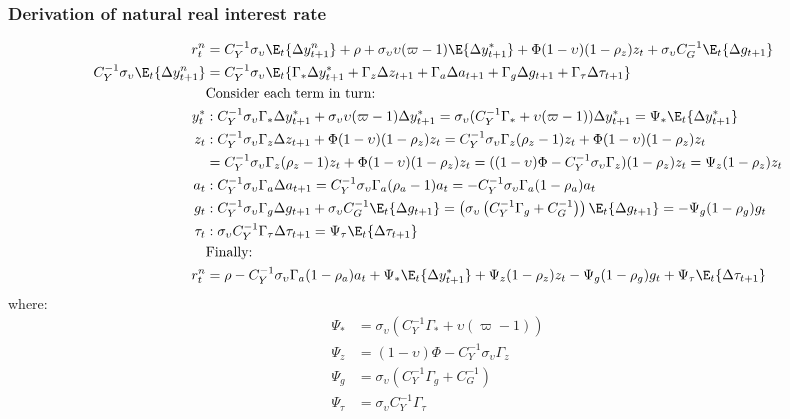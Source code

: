 \subsubsection*{Derivation of natural real interest rate}
\begin{align}
    r^n_t  &= C_Y^{-1}\sigma_\upsilon \E_t \{\Delta y^n_{t+1}\} + \rho + \sigma_\upsilon \upsilon (\varpi - 1)\E \{\Delta y_{t+1}^* \}  + \Phi (1-\upsilon)(1-\rho_z)z_t + \sigma_\upsilon C_G^{-1}\E_t \{ \Delta g_{t+1} \} \\
    C_Y^{-1} \sigma_\upsilon \E_t\{\Delta y^n_{t+1}\} &= C_Y^{-1} \sigma_\upsilon \E_t\{\Gamma_* \Delta y^*_{t+1} + \Gamma_z \Delta z_{t+1} + \Gamma_a \Delta a_{t+1} + \Gamma_g \Delta g_{t+1} + \Gamma_\tau \Delta \tau_{t+1}\}\\
    &\text{Consider each term in turn:}\nonumber\\
    y^*_t&: C_Y^{-1} \sigma_\upsilon \Gamma_* \Delta y^*_{t+1} + \sigma_\upsilon \upsilon(\varpi-1)\Delta y^*_{t+1} = \sigma_\upsilon(C_Y^{-1} \Gamma_* + \upsilon(\varpi-1))\Delta y^*_{t+1} = \Psi_* \E_t \{\Delta y^*_{t+1}\}\\
    z_t&: C_Y^{-1} \sigma_\upsilon \Gamma_z \Delta z_{t+1} + \Phi (1-\upsilon) (1-\rho_z)z_t = C_Y^{-1} \sigma_\upsilon \Gamma_z (\rho_z - 1)z_t + \Phi (1-\upsilon)(1-\rho_z)z_t\\
    &= C_Y^{-1} \sigma_\upsilon \Gamma_z (\rho_z - 1)z_t + \Phi (1-\upsilon)(1-\rho_z)z_t = ((1-\upsilon)\Phi - C_Y^{-1} \sigma_\upsilon \Gamma_z)(1-\rho_z)z_t = \Psi_z (1-\rho_z) z_t\\
    a_t&: C_Y^{-1} \sigma_\upsilon \Gamma_a \Delta a_{t+1} = C_Y^{-1} \sigma_\upsilon \Gamma_a (\rho_a - 1)a_t = - C_Y^{-1} \sigma_\upsilon \Gamma_a (1 - \rho_a)a_t\\
    g_t&: C_Y^{-1} \sigma_\upsilon \Gamma_g \Delta g_{t+1} + \sigma_\upsilon C_G^{-1}\E_t \{ \Delta g_{t+1} \}  = \left( \sigma_\upsilon \left( C_Y^{-1} \Gamma_g + C_G^{-1} \right)\right) \E_t \{ \Delta g_{t+1}\} = -\Psi_g (1-\rho_g)g_t\\
    \tau_t&: \sigma_\upsilon C_Y^{-1} \Gamma_\tau \Delta \tau_{t+1} = \Psi_\tau \E_t \{ \Delta \tau_{t+1}\}\\
    &\text{Finally:}\nonumber\\
    r^n_t  &= \rho - C_Y^{-1} \sigma_\upsilon \Gamma_a (1 - \rho_a)a_t + \Psi_* \E_t \{\Delta y^*_{t+1}\} + \Psi_z (1-\rho_z) z_t - \Psi_g (1-\rho_g)g_t +\Psi_\tau \E_t \{ \Delta \tau_{t+1}\}
\end{align}
where:
\begin{align}
    \Psi_* &= \sigma_\upsilon(C_Y^{-1} \Gamma_* + \upsilon(\varpi-1)) \\
    \Psi_z &= (1-\upsilon)\Phi - C_Y^{-1} \sigma_\upsilon \Gamma_z \\
    \Psi_g &= \sigma_\upsilon \left( C_Y^{-1} \Gamma_g + C_G^{-1} \right)\\
    \Psi_\tau &= \sigma_\upsilon C_Y^{-1} \Gamma_\tau
\end{align}
\newpage